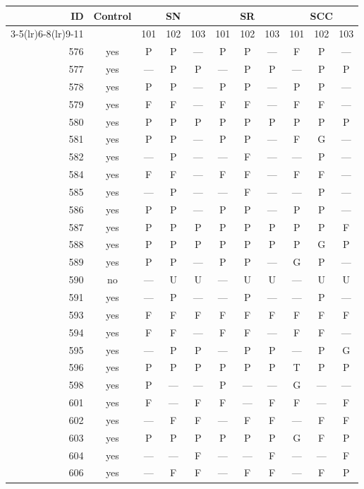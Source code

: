 \begin{table}[p]\centering\small
\begin{tabular*}{\textwidth}{@{\extracolsep{\fill}}rc*{9}{c}@{}}\toprule
ID & Control & \multicolumn{3}{c}{SN} & \multicolumn{3}{c}{SR} & \multicolumn{3}{c}{SCC}\\
\cmidrule(lr){3-5}\cmidrule(lr){6-8}\cmidrule(lr){9-11}
 & & 101 & 102 & 103 & 101 & 102 & 103 & 101 & 102 & 103\\\midrule
576 & yes & P & P & — & P & P & — & F & P & —\\
577 & yes & — & P & P & — & P & P & — & P & P\\
578 & yes & P & P & — & P & P & — & P & P & —\\
579 & yes & F & F & — & F & F & — & F & F & —\\
580 & yes & P & P & P & P & P & P & P & P & P\\
581 & yes & P & P & — & P & P & — & F & G & —\\
582 & yes & — & P & — & — & F & — & — & P & —\\
584 & yes & F & F & — & F & F & — & F & F & —\\
585 & yes & — & P & — & — & F & — & — & P & —\\
586 & yes & P & P & — & P & P & — & P & P & —\\
587 & yes & P & P & P & P & P & P & P & P & F\\
588 & yes & P & P & P & P & P & P & P & G & P\\
589 & yes & P & P & — & P & P & — & G & P & —\\
590 & no & — & U & U & — & U & U & — & U & U\\
591 & yes & — & P & — & — & P & — & — & P & —\\
593 & yes & F & F & F & F & F & F & F & F & F\\
594 & yes & F & F & — & F & F & — & F & F & —\\
595 & yes & — & P & P & — & P & P & — & P & G\\
596 & yes & P & P & P & P & P & P & T & P & P\\
598 & yes & P & — & — & P & — & — & G & — & —\\
601 & yes & F & — & F & F & — & F & F & — & F\\
602 & yes & — & F & F & — & F & F & — & F & F\\
603 & yes & P & P & P & P & P & P & G & F & P\\
604 & yes & — & — & F & — & — & F & — & — & F\\
606 & yes & — & F & F & — & F & F & — & F & P\\

\end{tabular*}
\end{table}
